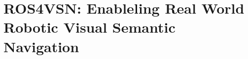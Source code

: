 \chapter{ROS4VSN: Enableling Real World Robotic Visual Semantic Navigation}\label{ch:ros4vsn:-enable-real-world-robotic-visual-semantic-navigation}

